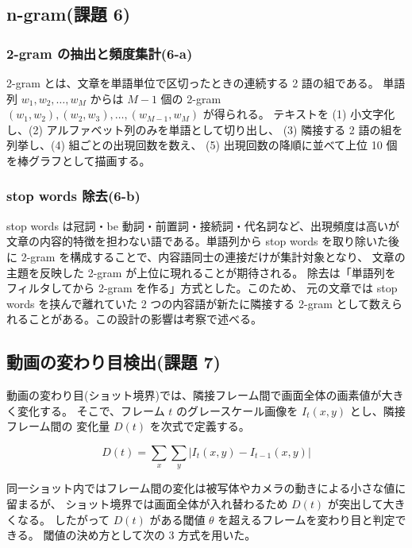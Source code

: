 \subsection{n-gram(課題 6)}

\subsubsection{2-gram の抽出と頻度集計(6-a)}

2-gram とは、文章を単語単位で区切ったときの連続する 2 語の組である。
単語列 $w_1, w_2, \ldots, w_M$ からは $M-1$ 個の 2-gram
$(w_1,w_2), (w_2,w_3), \ldots, (w_{M-1},w_M)$ が得られる。
テキストを (1) 小文字化し、(2) アルファベット列のみを単語として切り出し、
(3) 隣接する 2 語の組を列挙し、(4) 組ごとの出現回数を数え、
(5) 出現回数の降順に並べて上位 10 個を棒グラフとして描画する。

\subsubsection{stop words 除去(6-b)}

stop words は冠詞・be 動詞・前置詞・接続詞・代名詞など、出現頻度は高いが
文章の内容的特徴を担わない語である。単語列から stop words を取り除いた後に
2-gram を構成することで、内容語同士の連接だけが集計対象となり、
文章の主題を反映した 2-gram が上位に現れることが期待される。
除去は「単語列をフィルタしてから 2-gram を作る」方式とした。このため、
元の文章では stop words を挟んで離れていた 2 つの内容語が新たに隣接する
2-gram として数えられることがある。この設計の影響は考察で述べる。

\subsection{動画の変わり目検出(課題 7)}

動画の変わり目(ショット境界)では、隣接フレーム間で画面全体の画素値が大きく変化する。
そこで、フレーム $t$ のグレースケール画像を $I_t(x, y)$ とし、隣接フレーム間の
変化量 $D(t)$ を次式で定義する。

\begin{equation}\label{eq:sad}
D(t) = \sum_{x} \sum_{y} \left| I_t(x, y) - I_{t-1}(x, y) \right|
\end{equation}

同一ショット内ではフレーム間の変化は被写体やカメラの動きによる小さな値に留まるが、
ショット境界では画面全体が入れ替わるため $D(t)$ が突出して大きくなる。
したがって $D(t)$ がある閾値 $\theta$ を超えるフレームを変わり目と判定できる。
閾値の決め方として次の 3 方式を用いた。

